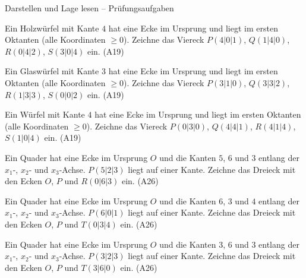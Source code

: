 \begin{aufgabe}{Darstellen und Lage lesen – Prüfungsaufgaben}
\begin{teile}
\teil Ein Holzwürfel mit Kante $4$ hat eine Ecke im Ursprung und liegt im ersten Oktanten (alle Koordinaten $\ge 0$). Zeichne das Viereck $P(4 | 0 | 1)$, $Q(1 | 4 | 0)$, $R(0 | 4 | 2)$, $S(3 | 0 | 4)$ ein. \hfill (A19)

\begin{ksys3}  \end{ksys3}
\teil Ein Glaswürfel mit Kante $3$ hat eine Ecke im Ursprung und liegt im ersten Oktanten (alle Koordinaten $\ge 0$). Zeichne das Viereck $P(3 | 1 | 0)$, $Q(3 | 3 | 2)$, $R(1 | 3 | 3)$, $S(0 | 0 | 2)$ ein. \hfill (A19)

\begin{ksys3}  \end{ksys3}
\teil Ein Würfel mit Kante $4$ hat eine Ecke im Ursprung und liegt im ersten Oktanten (alle Koordinaten $\ge 0$). Zeichne das Viereck $P(0 | 3 | 0)$, $Q(4 | 4 | 1)$, $R(4 | 1 | 4)$, $S(1 | 0 | 4)$ ein. \hfill (A19)

\begin{ksys3}  \end{ksys3}
\teil Ein Quader hat eine Ecke im Ursprung $O$ und die Kanten $5$, $6$ und $3$ entlang der $x_1$-, $x_2$- und $x_3$-Achse. $P(5 | 2 | 3)$ liegt auf einer Kante. Zeichne das Dreieck mit den Ecken $O$, $P$ und $R(0 | 6 | 3)$ ein. \hfill (A26)

\begin{ksys3}  \end{ksys3}
\teil Ein Quader hat eine Ecke im Ursprung $O$ und die Kanten $6$, $3$ und $4$ entlang der $x_1$-, $x_2$- und $x_3$-Achse. $P(6 | 0 | 1)$ liegt auf einer Kante. Zeichne das Dreieck mit den Ecken $O$, $P$ und $T(0 | 3 | 4)$ ein. \hfill (A26)

\begin{ksys3}  \end{ksys3}
\teil Ein Quader hat eine Ecke im Ursprung $O$ und die Kanten $3$, $6$ und $3$ entlang der $x_1$-, $x_2$- und $x_3$-Achse. $P(3 | 2 | 3)$ liegt auf einer Kante. Zeichne das Dreieck mit den Ecken $O$, $P$ und $T(3 | 6 | 0)$ ein. \hfill (A26)

\begin{ksys3}  \end{ksys3}
\end{teile}
\end{aufgabe}

